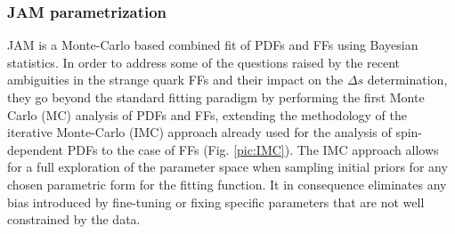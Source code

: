 \subsubsection*{JAM parametrization}

JAM is a Monte-Carlo based combined fit of PDFs and FFs using Bayesian statistics. In order to address some of the questions raised by the recent ambiguities in the strange quark FFs and their impact on the $\Delta s$ determination, they go beyond the standard fitting paradigm by performing the first Monte Carlo (MC) analysis of PDFs and FFs, extending the methodology of the iterative Monte-Carlo (IMC) approach already used for the analysis of spin-dependent PDFs\cite{IMC} to the case of FFs (Fig. \ref{pic:IMC}). The IMC approach allows for a full exploration of the parameter space when sampling initial priors for any chosen parametric form for the fitting function. It in consequence eliminates any bias introduced by fine-tuning or fixing specific parameters that are not well constrained by the data.


